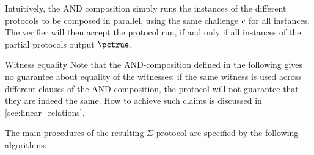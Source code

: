 \documentclass[11pt]{article}
\begin{document}
  Intuitively, the AND composition simply runs the instances of the different protocols to be composed in parallel, using the same challenge $c$ for all instances.
  The verifier will then accept the protocol run, if and only if all instances of the partial protocols output $\accept$.
  \begin{warning}{Witness equality}{}
  Note that the AND-composition defined in the following gives no guarantee about equality of the witnesses: if the same witness is used across different clauses of the AND-composition, the protocol will not guarantee that they are indeed the same.
	How to achieve such claims is discussed in \cref{sec:linear_relations}.
  \end{warning}

The main procedures of the resulting $\Sigma$-protocol are specified by the following algorithms:
\end{document}
